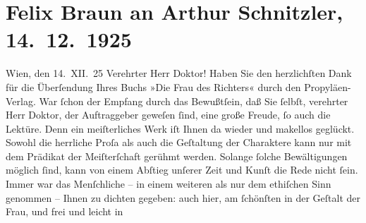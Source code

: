

         \renewcommand{\erwaehnteInstitutionen}{Institutionen: Propyläen Verlag}
         \renewcommand{\erwaehnteOrte}{Orte: Wien}
         \renewcommand{\erwaehnteWerke}{Werke: Die Frau des Richters. Novelle}
               \section[Felix Braun an Arthur Schnitzler, 14. 12. 1925]{ Felix Braun an Arthur Schnitzler, 14. 12. 1925}\nopagebreak{}\rehead{ }\begin{ledgroupsized}[t]{13cm}\normalsize\beginnumbering \toendnotes[C]{\smallbreak\pagebreak[2]} 
\toendnotes[C]{\smallbreak}\pstart
           \centering{}{\pb}Wien, den 14. XII. 25\pend
           \pstart{}Verehrter Herr Doktor!\pend\pstart
           Haben Sie den herzlichſten Dank für die Überſendung Ihres Buchs »Die Frau des Richters« durch den Propyläen-Verlag. War ſchon der Empfang durch das
                    Bewußtſein, daß Sie ſelbſt, verehrter Herr Doktor, der Auftraggeber geweſen
                    ſind, eine große Freude, ſo auch die Lektüre. Denn ein meiſterliches Werk iſt
                    Ihnen da wieder und makellos geglückt. Sowohl die herrliche Proſa als auch die
                    Geſtaltung der Charaktere kann nur mit dem Prädikat der Meiſter{\pb}ſchaft gerühmt werden. Solange ſolche Bewältigungen möglich ſind, kann von
                    einem Abſtieg unſerer Zeit und Kunſt die Rede nicht ſein.\pend
           \pstart
           Immer war das Menſchliche – in einem weiteren als nur dem ethiſchen Sinn genommen
                    – Ihnen zu dichten gegeben: auch hier, am ſchönſten in der Geſtalt der Frau, und frei und leicht in

\end{ledgroupsized}
